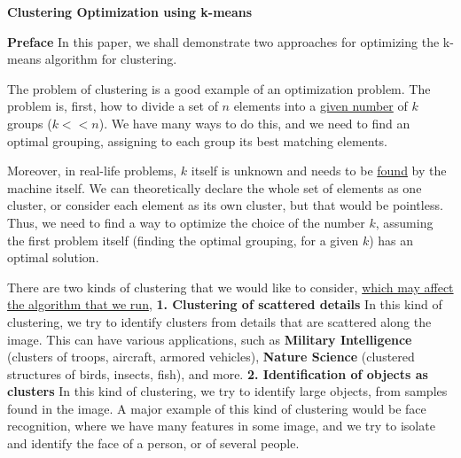 \documentclass[12pt]{article}
\begin{document}
\onehalfspacing
\textbf{\huge Clustering Optimization using k-means} \newline

\textbf{\large Preface} \newline
In this paper, we shall demonstrate two approaches for optimizing the \newline
k-means algorithm for clustering. \newline

The problem of clustering is a good example of an optimization problem. \newline 
The problem is, first, how to divide a set of $n$ elements into a \underline{given number} of $k$ groups ($k << n$). We have many ways to do this, and we need to find an optimal grouping, assigning to each group its best matching elements. \newline

Moreover, in real-life problems, $k$ itself is unknown and needs to be \underline{found} by the machine itself. We can theoretically declare the whole set of elements as one cluster, or consider each element as its own cluster, but that would be pointless. Thus, we need to find a way to optimize the choice of the number $k$, assuming the first problem itself (finding the optimal grouping, for a given $k$) has an optimal solution. \newline

There are two kinds of clustering that we would like to consider, \newline
\underline{which may affect the algorithm that we run}, \newline \newline
\textbf{1. Clustering of scattered details} \newline
In this kind of clustering, we try to identify clusters from details that are scattered along the image.
This can have various applications, such as \newline \textbf{Military Intelligence} (clusters of troops, aircraft, armored vehicles), \newline
\textbf{Nature Science} (clustered structures of birds, insects, fish), and more.
\newpage
\textbf{2. Identification of objects as clusters} \newline
In this kind of clustering, we try to identify large objects, from samples found in the image. A major example of this kind of clustering would be face recognition, 
where we have many features in some image, and we try to isolate and
identify the face of a person, or of several people. \newline
\end{document}
